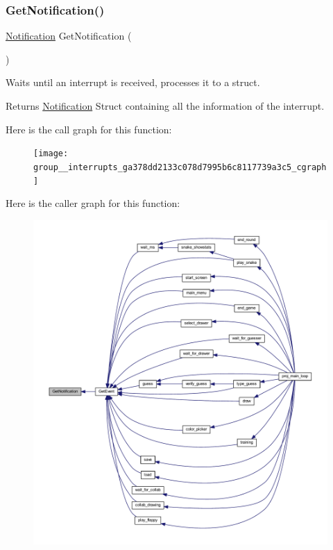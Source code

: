 \subsubsection{\texorpdfstring{Get\+Notification()}{GetNotification()}}
{\footnotesize\ttfamily \mbox{\hyperlink{struct_notification}{Notification}} Get\+Notification (\begin{DoxyParamCaption}{ }\end{DoxyParamCaption})}



Waits until an interrupt is received, processes it to a struct. 

\begin{DoxyReturn}{Returns}
\mbox{\hyperlink{struct_notification}{Notification}} Struct containing all the information of the interrupt. 
\end{DoxyReturn}
Here is the call graph for this function\+:
\nopagebreak
\begin{figure}[H]
\begin{center}
\leavevmode
\texttt{[image: group\_\_interrupts\_ga378dd2133c078d7995b6c8117739a3c5\_cgraph]}
\end{center}
\end{figure}
Here is the caller graph for this function\+:\nopagebreak
\begin{figure}[H]
\begin{center}
\leavevmode
\includegraphics[width=350pt]{group__interrupts_ga378dd2133c078d7995b6c8117739a3c5_icgraph}
\end{center}
\end{figure}
\mbox{\label{group__interrupts_ga52c0411fc9786e0c38241ab3584c7dd8}} 

